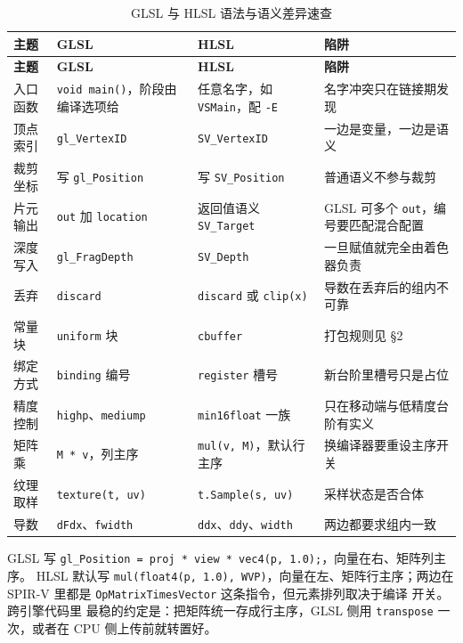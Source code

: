 \documentclass[12pt,a4paper,fontset=fandol]{ctexbook}
\newcommand{\Tp}[1]{\texttt{#1}}
\newcommand{\Bk}{\discretionary{}{}{}}
\newcommand{\Lang}[1]{\textsf{#1}}
\newcommand{\DomCPU}{\Lang{CPU}}
\newcommand{\GSL}{\Lang{GLSL}}
\newcommand{\HSL}{\Lang{HLSL}}
\newcommand{\SPIV}{\Lang{SPIR-V}}
\begin{document}
\begin{longtable}{>{\raggedright\arraybackslash}p{}
                  >{\raggedright\arraybackslash}p{}
                  >{\raggedright\arraybackslash}p{}
                  >{\raggedright\arraybackslash}p{}}
\caption{\GSL{} 与 \HSL{} 语法与语义差异速查}\label{tab:ch06-glsl-hlsl} \\
\toprule
\textbf{主题} & \textbf{\GSL{}} & \textbf{\HSL{}} & \textbf{陷阱} \\
\midrule
\endfirsthead
\toprule
\textbf{主题} & \textbf{\GSL{}} & \textbf{\HSL{}} & \textbf{陷阱} \\
\midrule
\endhead
\midrule
\endfoot
\bottomrule
\endlastfoot
入口函数 & \Tp{void main()}，阶段由编译选项给 & 任意名字，如 \Tp{VSMain}，配 \Tp{-E} & 名字冲突只在链接期发现 \\
顶点索引 & \Tp{gl\_VertexID} & \Tp{SV\_VertexID} & 一边是变量，一边是语义 \\
裁剪坐标 & 写 \Tp{gl\_Position} & 写 \Tp{SV\_Position} & 普通语义不参与裁剪 \\
片元输出 & \Tp{out} 加 \Tp{location} & 返回值语义 \Tp{SV\_Target} & \GSL{} 可多个 \Tp{out}，编号要匹配混合配置 \\
深度写入 & \Tp{gl\_FragDepth} & \Tp{SV\_Depth} & 一旦赋值就完全由着色器负责 \\
丢弃 & \Tp{discard} & \Tp{discard} 或 \Tp{clip(x)} & 导数在丢弃后的组内不可靠 \\
常量块 & \Tp{uniform} 块 & \Tp{cbuffer} & 打包规则见 §2 \\
绑定方式 & \Tp{binding} 编号 & \Tp{register} 槽号 & 新台阶里槽号只是占位 \\
精度控制 & \Tp{highp}、\Tp{mediump} & \Tp{min16float} 一族 & 只在移动端与低精度台阶有实义 \\
矩阵乘 & \Tp{M * v}，列主序 & \Tp{mul(v, M)}，默认行主序 & 换编译器要重设主序开关 \\
纹理取样 & \Tp{texture(t, uv)} & \Tp{t.Sample(s, uv)} & 采样状态是否合体 \\
导数 & \Tp{dFdx}、\Tp{fwidth} & \Tp{ddx}、\Tp{ddy}、\Tp{width} & 两边都要求组内一致 \\
\end{longtable}

\begin{compare}[title={同一个乘法的四种写法}]
\GSL{} 写 \Tp{gl\_Position = proj * view * vec4(p, 1.0);}，向量在右、矩阵列主序。
\HSL{} 默认写 \Tp{mul(float4(p, 1.0), WVP)}，向量在左、矩阵行主序；两边在
\SPIV{} 里都是 \Tp{Op\Bk Matrix\Bk Times\Bk Vector} 这条指令，但元素排列取决于编译
开关。跨引擎代码里
最稳的约定是：把矩阵统一存成行主序，\GSL{} 侧用 \Tp{transpose} 一次，或者在
\DomCPU{} 侧上传前就转置好。
\end{compare}
\end{document}
